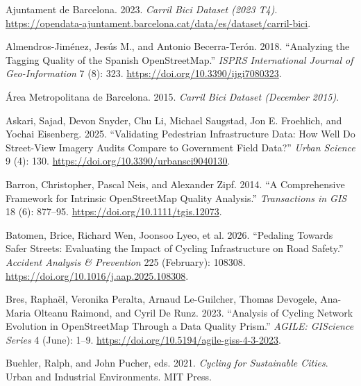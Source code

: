\documentclass[
]{article}
\newlength{\cslhangindent}
\newenvironment{CSLReferences}[2] %
 {\begin{list}{}{%
  \setlength{\itemindent}{0pt}
  \setlength{\leftmargin}{0pt}
  \setlength{\parsep}{0pt}
  \ifodd #1
   \setlength{\leftmargin}{\cslhangindent}
   \setlength{\itemindent}{-1\cslhangindent}
  \fi
  \setlength{\itemsep}{#2\baselineskip}}}
 {\end{list}}
\begin{document}
\protect{}\label{refs}
\begin{CSLReferences}{1}{1}
Ajuntament de Barcelona. 2023. \emph{Carril Bici Dataset (2023 T4)}.
\url{https://opendata-ajuntament.barcelona.cat/data/es/dataset/carril-bici}.

Almendros-Jiménez, Jesús M., and Antonio Becerra-Terón. 2018.
{``Analyzing the {Tagging} {Quality} of the {Spanish}
{OpenStreetMap}.''} \emph{ISPRS International Journal of
Geo-Information} 7 (8): 323. \url{https://doi.org/10.3390/ijgi7080323}.

Área Metropolitana de Barcelona. 2015. \emph{Carril Bici Dataset
(December 2015)}.

Askari, Sajad, Devon Snyder, Chu Li, Michael Saugstad, Jon E. Froehlich,
and Yochai Eisenberg. 2025. {``Validating {Pedestrian} {Infrastructure}
{Data}: {How} {Well} {Do} {Street}-{View} {Imagery} {Audits} {Compare}
to {Government} {Field} {Data}?''} \emph{Urban Science} 9 (4): 130.
\url{https://doi.org/10.3390/urbansci9040130}.

Barron, Christopher, Pascal Neis, and Alexander Zipf. 2014. {``A
{Comprehensive} {Framework} for {Intrinsic} {OpenStreetMap} {Quality}
{Analysis}.''} \emph{Transactions in GIS} 18 (6): 877--95.
\url{https://doi.org/10.1111/tgis.12073}.

Batomen, Brice, Richard Wen, Joonsoo Lyeo, et al. 2026. {``Pedaling
Towards Safer Streets: Evaluating the Impact of Cycling Infrastructure
on Road Safety.''} \emph{Accident Analysis \& Prevention} 225
(February): 108308. \url{https://doi.org/10.1016/j.aap.2025.108308}.

Bres, Raphaël, Veronika Peralta, Arnaud Le-Guilcher, Thomas Devogele,
Ana-Maria Olteanu Raimond, and Cyril De Runz. 2023. {``Analysis of
Cycling Network Evolution in {OpenStreetMap} Through a Data Quality
Prism.''} \emph{AGILE: GIScience Series} 4 (June): 1--9.
\url{https://doi.org/10.5194/agile-giss-4-3-2023}.

Buehler, Ralph, and John Pucher, eds. 2021. \emph{Cycling for
Sustainable Cities}. Urban and {Industrial} {Environments}. MIT Press.


\end{CSLReferences}
\end{document}
